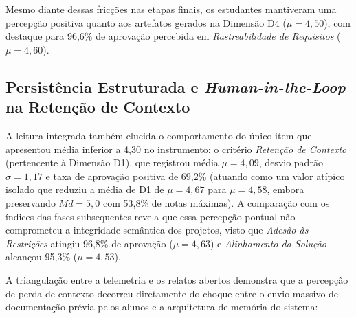 Mesmo diante dessas fricções nas etapas finais, os estudantes mantiveram uma percepção positiva quanto aos artefatos gerados na Dimensão D4 ($\mu = 4,50$), com destaque para 96,6\% de aprovação percebida em \textit{Rastreabilidade de Requisitos} ($\mu = 4,60$).

\subsection{Persistência Estruturada e \textit{Human-in-the-Loop} na Retenção de Contexto}

A leitura integrada também elucida o comportamento do único item que apresentou média inferior a 4,30 no instrumento: o critério \textit{Retenção de Contexto} (pertencente à Dimensão D1), que registrou média $\mu = 4,09$, desvio padrão $\sigma = 1,17$ e taxa de aprovação positiva de 69,2\% (atuando como um valor atípico isolado que reduziu a média de D1 de $\mu = 4,67$ para $\mu = 4,58$, embora preservando $Md = 5,0$ com 53,8\% de notas máximas). A comparação com os índices das fases subsequentes revela que essa percepção pontual não comprometeu a integridade semântica dos projetos, visto que \textit{Adesão às Restrições} atingiu 96,8\% de aprovação ($\mu = 4,63$) e \textit{Alinhamento da Solução} alcançou 95,3\% ($\mu = 4,53$).

A triangulação entre a telemetria e os relatos abertos demonstra que a percepção de perda de contexto decorreu diretamente do choque entre o envio massivo de documentação prévia pelos alunos e a arquitetura de memória do sistema:

